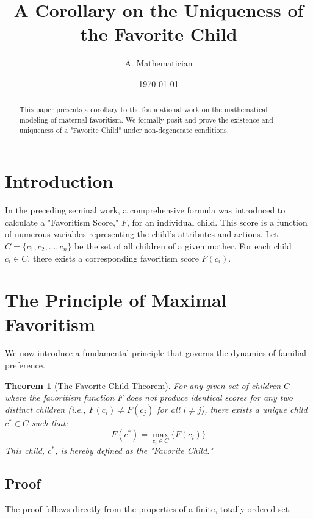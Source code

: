 \documentclass[12pt]{article}
\title{A Corollary on the Uniqueness of the Favorite Child}
\author{A. Mathematician}
\date{\today}
\begin{document}
\maketitle

\begin{abstract}
This paper presents a corollary to the foundational work on the mathematical modeling of maternal favoritism. We formally posit and prove the existence and uniqueness of a "Favorite Child" under non-degenerate conditions.
\end{abstract}

\section{Introduction}

In the preceding seminal work, a comprehensive formula was introduced to calculate a "Favoritism Score," \( F \), for an individual child. This score is a function of numerous variables representing the child's attributes and actions. Let \( C = \{c_1, c_2, \dots, c_n\} \) be the set of all children of a given mother. For each child \( c_i \in C \), there exists a corresponding favoritism score \( F(c_i) \).

\section{The Principle of Maximal Favoritism}

We now introduce a fundamental principle that governs the dynamics of familial preference.

\newtheorem{theorem}{Theorem}
\begin{theorem}[The Favorite Child Theorem]
For any given set of children \( C \) where the favoritism function \( F \) does not produce identical scores for any two distinct children (i.e., \( F(c_i) \neq F(c_j) \) for all \( i \neq j \)), there exists a unique child \( c^* \in C \) such that:
\begin{equation}
F(c^*) = \max_{c_i \in C} \{F(c_i)\}
\end{equation}
This child, \( c^* \), is hereby defined as the "Favorite Child."
\end{theorem}

\subsection{Proof}

The proof follows directly from the properties of a finite, totally ordered set.
\end{document}
